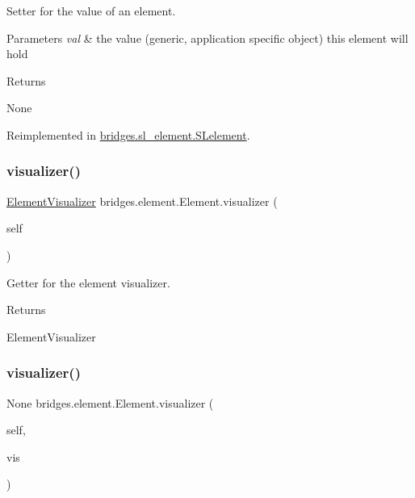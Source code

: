 Setter for the value of an element. 


\begin{DoxyParams}{Parameters}
{\em val} & the value (generic, application specific object) this element will hold \\
\hline
\end{DoxyParams}
\begin{DoxyReturn}{Returns}


None 
\end{DoxyReturn}


Reimplemented in \mbox{\hyperlink{classbridges_1_1sl__element_1_1_s_lelement_a7653b41a8bc2c8ba7a71f07c8b0b8f3f}{bridges.\+sl\+\_\+element.\+S\+Lelement}}.

\mbox{\label{classbridges_1_1element_1_1_element_a704bd547988e01648f5b2d40896145e9}} 
\subsubsection{\texorpdfstring{visualizer()}{visualizer()}\hspace{0.1cm}{\footnotesize\ttfamily [1/2]}}
{\footnotesize\ttfamily  \mbox{\hyperlink{classbridges_1_1element__visualizer_1_1_element_visualizer}{Element\+Visualizer}} bridges.\+element.\+Element.\+visualizer (\begin{DoxyParamCaption}\item[{}]{self }\end{DoxyParamCaption})}



Getter for the element visualizer. 

\begin{DoxyReturn}{Returns}


Element\+Visualizer 
\end{DoxyReturn}
\mbox{\label{classbridges_1_1element_1_1_element_a147c45010c473395ee93368a8e3ac6dc}} 
\subsubsection{\texorpdfstring{visualizer()}{visualizer()}\hspace{0.1cm}{\footnotesize\ttfamily [2/2]}}
{\footnotesize\ttfamily  None bridges.\+element.\+Element.\+visualizer (\begin{DoxyParamCaption}\item[{}]{self,  }\item[{\mbox{\hyperlink{classbridges_1_1element__visualizer_1_1_element_visualizer}{Element\+Visualizer}}}]{vis }\end{DoxyParamCaption})}



